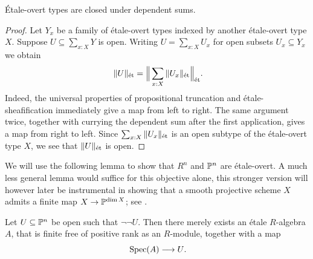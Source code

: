 \begin{proposition}
  \label{étale-overt-is-sigma-closed}
  Étale-overt types are closed under dependent sums.
\end{proposition}

\begin{proof}
  Let $Y_x$ be a family of étale-overt types indexed by another étale-overt type $X$.
  Suppose $U \subseteq \sum_{x:X} Y$ is open.
  Writing $U = \sum_{x:X}U_x$ for open subsets $U_x \subseteq Y_x$ we obtain
  \[
    \|U\|_\et = \Big\|\sum_{x:X} \|U_x\|_\et\Big\|_\et\rlap{.}
  \]
  Indeed, the universal properties of propositional truncation and étale-sheafification immediately give a map from left to right. The same argument twice, together with currying the dependent sum after the first application, gives a map from right to left.
  Since $\sum_{x:X} \|U_x\|_\et$ is an open subtype of the étale-overt type $X$, we see that $\|U\|_\et$ is open.
\end{proof}

We will use the following lemma to show that $R^n$ and $\bP^n$ are étale-overt.
A much less general lemma would suffice for this objective alone, this stronger version will however later be instrumental in showing that a smooth projective scheme $X$ admits a finite map $X \to \bP^{\dim X}$; see .

\begin{lemma}
    \label{consume-non-emptiness-of-open-subset}
  Let $U \subseteq \bP^n$ be open such that $\neg\neg U$.
  Then there merely exists an étale $R$-algebra $A$, that is finite free of positive rank as an $R$-module, together with a map
  \[
    \Spec(A) \longrightarrow U \rlap{.}
  \]
\end{lemma}

